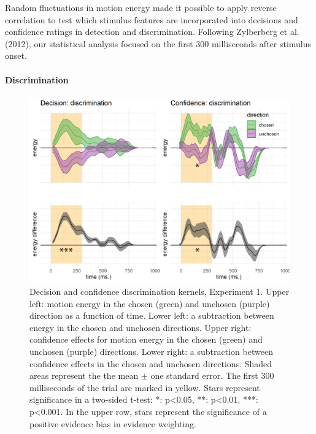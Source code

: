 \documentclass[12pt,twoside]{reedthesis}
\begin{document}
Random fluctuations in motion energy made it possible to apply reverse correlation to test which stimulus features are incorporated into decisions and confidence ratings in detection and discrimination. Following Zylberberg et al. (2012), our statistical analysis focused on the first 300 milliseconds after stimulus onset.

\hypertarget{e1-disc-RC}{%
\paragraph{Discrimination}\label{e1-disc-RC}}


\begin{figure}
\includegraphics[width=\textwidth]{figure/RC/RC-exp1-discrimination-RC-enhanced} \caption[Reverse correlation of discrimination trials, Exp. 1]{Decision and confidence discrimination kernels, Experiment 1. Upper left: motion energy in the chosen (green) and unchosen (purple) direction as a function of time. Lower left: a subtraction between energy in the chosen and unchosen directions. Upper right: confidence effects for motion energy in the chosen (green) and unchosen (purple) directions. Lower right: a subtraction between confidence effects in the chosen and unchosen directions. Shaded areas represent the the mean \(\pm\) one standard error. The first 300 milliseconds of the trial are marked in yellow. Stars represent significance in a two-sided t-test: *: p\textless0.05, **: p\textless0.01, ***: p\textless0.001. In the upper row, stars represent the significance of a positive evidence bias in evidence weighting.}\label{fig:RC-exp1-discrimination-RC}
\end{figure}
\end{document}
